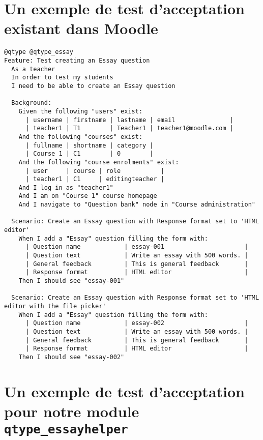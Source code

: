 \appendix
\chapter{Un exemple de test d'acceptation existant dans Moodle}
\label{annexe_behat_exist}

\begin{lstlisting}[language=behat,frame=l]
@qtype @qtype_essay
Feature: Test creating an Essay question
  As a teacher
  In order to test my students
  I need to be able to create an Essay question

  Background:
    Given the following "users" exist:
      | username | firstname | lastname | email               |
      | teacher1 | T1        | Teacher1 | teacher1@moodle.com |
    And the following "courses" exist:
      | fullname | shortname | category |
      | Course 1 | C1        | 0        |
    And the following "course enrolments" exist:
      | user     | course | role           |
      | teacher1 | C1     | editingteacher |
    And I log in as "teacher1"
    And I am on "Course 1" course homepage
    And I navigate to "Question bank" node in "Course administration"

  Scenario: Create an Essay question with Response format set to 'HTML editor'
    When I add a "Essay" question filling the form with:
      | Question name            | essay-001                      |
      | Question text            | Write an essay with 500 words. |
      | General feedback         | This is general feedback       |
      | Response format          | HTML editor                    |
    Then I should see "essay-001"

  Scenario: Create an Essay question with Response format set to 'HTML editor with the file picker'
    When I add a "Essay" question filling the form with:
      | Question name            | essay-002                      |
      | Question text            | Write an essay with 500 words. |
      | General feedback         | This is general feedback       |
      | Response format          | HTML editor                    |
    Then I should see "essay-002"
\end{lstlisting}

\chapter{Un exemple de test d'acceptation pour notre module \texttt{qtype\_essayhelper}}
\label{annexe_behat_new}

